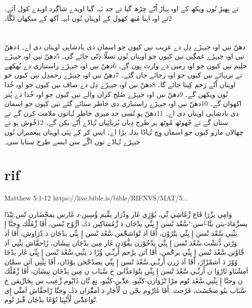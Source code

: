 \documentclass[12pt,fleqn,titlepage,twoside,a4paper]{book}
\begin{document}
\begin{arab}[utf]
\section*{}

تے بِھیڑ نُوں ویکھ کے اوہ پہاڑ اُتّے چڑھ گیا تے جد بَہہ گیا اوہدے شاگِرد اوہدے کول آئے۔ 2تے اوہ اپنا مُنھ کھول کے اوہناں نُوں ایہہ آکھ کے سکھان لگّا۔

\section*{}

دھنّ نیں اوہ جیہڑے دِل دے غرِیب نیں
کیوں جو اسمان دی بادشاہی اوہناں دی اے۔
4دھنّ نیں اوہ جیہڑے غمگِین نیں
کیوں جو اوہناں نُوں تسلّا دِتّی جائے گی۔
5دھنّ نیں اوہ جیہڑے حلِیم نیں
کیوں جو اوہ زمین دے وارث ہون گے۔
6دھنّ نیں اوہ جیہڑے راستبازی دے بُھکھے تے تریہائے نیں
کیوں جو اوہ رجائے جان گئے۔
7دھنّ نیں اوہ جیہڑے رحمدِل نیں
کیوں جو اوہناں اُتّے رَحم کِیتا جائے گا۔
8دھنّ نیں اوہ جیہڑے دِل دے صاف نیں
کیوں جو اوہ خُدا نُوں ویکھن گے۔
9دھنّ نیں اوہ جیہڑے صُلح کران والے نیں
کیوں جو اوہ خُدا دے پُتر اکھوان گے۔
10دھنّ نیں اوہ جیہڑے راستبازی دی خاطر ستائے گئے نیں
کیوں جو اسمان دی بادشاہی اوہناں دی اے۔
11دھنّ ہو تُسی جد میری خاطر تُہانوں ملامت کرن گے تے ستان گے تے جُھوٹھ مُوٹھ ہر طرح دِیاں بُریائِیاں تُہاڈے اُتّے بکن گے۔ 12خُوش ہو تے چھالاں مارو کیوں جو اسمان وِچ تُہاڈا بدلہ بڑا اے۔ ایس کر کے پئی اوہناں پیغمبراں نُوں جیہڑے تُہاڈے توں اگّے سن ایسے طرح ستایا سی۔

\end{arab}

\section{rif}

Matthew 5:1-12 https://live.bible.is/bible/RIFNVS/MAT/5...

\begin{arab}[utf]

وَامِي يژْرَا قَاع ڒْغَاشِي نِّي، يُوْڒِي غَار وذْرَار يقِّيم ؤُسِين-د غَارس يمحْضَارن نّس.ئِبْذَا يسڒْمَاذ-يثن ينَّا-ٱسن:"سَّعْذ نْسن إِ يِنِّي يدْجَان ذ ڒْمُسَاكِين ذݣ اَرُّوْح نْسن، أَقَا ڒْمُلْك وجنَّا إِ نِثْنِي.سَّعْذ نْسن إِ يِنِّي يتْرُوْن، أَقَا اَذ تْوَاشجّْعن.سَّعْذ نْسن إِ يِنِّي يدْجَان ذ دْرَاوش، أَقَا اَذ وَرْثن دُّنشْت.سَّعْذ نْسن إِ يِنِّي يدْجُوْزن يفُّوْذن غَار مِين يدْجَان نِيشَان، ڒَاحقَّاش نِثْنِي اَذ جَّاوْنن.سَّعْذ نْسن إِ يِنِّي يرحّْمن، أَقَا اَثن يرْحم أَربِّـي ؤُڒَا ذ نِثْنِي.سَّعْذ نْسن إِ يِنِّي غَار يدْجَا وُوْڒ ذ اَشمْڒَاڒ، أَقَا اَذ ژرن أَربِّـي.سَّعْذ نْسن إِ يِنِّي يصدْجْحن يوْذَان، أَقَا نِثْنِي اَثن سمَّان اَمشْنَاو ثَارْوَا ن أَربِّـي.سَّعْذ نْسن إِ يِنِّي يتْوَاعدَّابن خ سَّبَاب ن مِين يدْجَان نِيشَان، أَقَا ڒْمُلْك ن وجنَّا إِ نِثْنِي.سَّعْذ نْوم مڒَا تْزَوَارن-كنِّيو، عدّْبن-كنِّيو، نِغ نَّان ذَايْوم ڒْعِيب س يخَارِّيقن خ سَّبَاب ينُو.ضحْشث، فَرْحث. أَقَا غَارْوم يجّن ن لْأَجَار ذ اَمقّْرَان ذݣ وجنَّا ڒَاحقَّاش اَمنِّي إِي تْوَاعدّْبن لْأَنْبِيَا تُوْغَا يدْجَان قْبڒ نْوم.

\end{arab}
\end{document}
